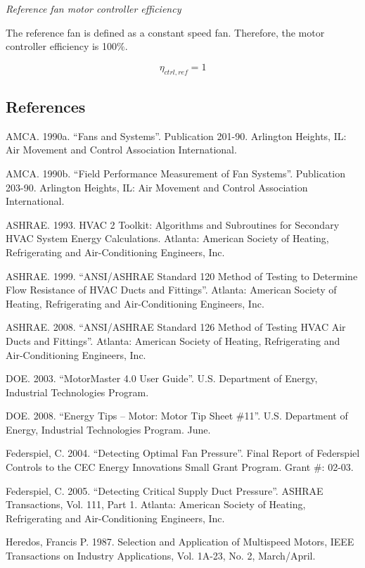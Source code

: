 \emph{Reference fan motor controller efficiency}


The reference fan is defined as a constant speed fan. Therefore, the motor controller efficiency is 100$\%$.

\begin{equation}
\eta_{ctrl,ref} = 1
\label{eq:eta_ctrl_calculation}
\end{equation}

\subsection{References}\label{references-002}

AMCA. 1990a. ``Fans and Systems''. Publication 201-90. Arlington Heights, IL: Air Movement and Control Association International.

AMCA. 1990b. ``Field Performance Measurement of Fan Systems''. Publication 203-90. Arlington Heights, IL: Air Movement and Control Association International.

ASHRAE. 1993. HVAC 2 Toolkit: Algorithms and Subroutines for Secondary HVAC System Energy Calculations. Atlanta: American Society of Heating, Refrigerating and Air-Conditioning Engineers, Inc.

ASHRAE. 1999. ``ANSI/ASHRAE Standard 120 Method of Testing to Determine Flow Resistance of HVAC Ducts and Fittings''. Atlanta: American Society of Heating, Refrigerating and Air-Conditioning Engineers, Inc.

ASHRAE. 2008. ``ANSI/ASHRAE Standard 126 Method of Testing HVAC Air Ducts and Fittings''. Atlanta: American Society of Heating, Refrigerating and Air-Conditioning Engineers, Inc.

DOE. 2003. ``MotorMaster 4.0 User Guide''. U.S. Department of Energy, Industrial Technologies Program.

DOE. 2008. ``Energy Tips -- Motor: Motor Tip Sheet \#11''. U.S. Department of Energy, Industrial Technologies Program. June.

Federspiel, C. 2004. ``Detecting Optimal Fan Pressure''. Final Report of Federspiel Controls to the CEC Energy Innovations Small Grant Program. Grant \#: 02-03.

Federspiel, C. 2005. ``Detecting Critical Supply Duct Pressure''. ASHRAE Transactions, Vol. 111, Part 1. Atlanta: American Society of Heating, Refrigerating and Air-Conditioning Engineers, Inc.

Heredos, Francis P. 1987. Selection and Application of Multispeed Motors, IEEE Transactions on Industry Applications, Vol. 1A-23, No. 2, March/April.

